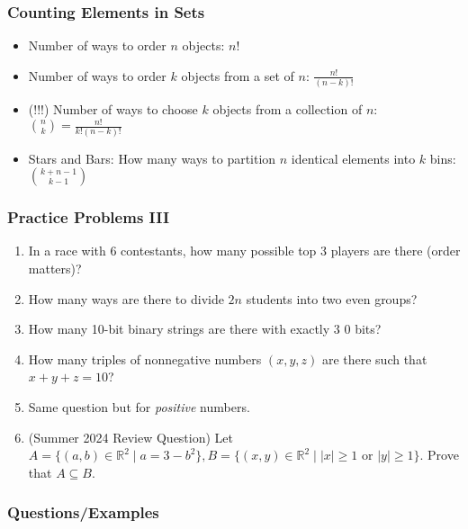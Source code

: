 \documentclass{beamer}
\begin{document}
\begin{frame}
  \frametitle{Counting Elements in Sets}
  \begin{itemize}[<+->]
    \item Number of ways to order $n$ objects: $n!$
    \item Number of ways to order $k$ objects from a set of $n$: $\frac{n!}{(n-k)!}$
    \item (!!!) Number of ways to choose $k$ objects from a collection of $n$: ${n \choose k} = \frac{n!}{k!(n - k)!}$
    \item Stars and Bars: How many ways to partition $n$ identical elements into $k$ bins: ${k + n - 1 \choose k - 1}$
  \end{itemize}
\end{frame}

\begin{frame}[t]
  \frametitle{Practice Problems III}
  \begin{enumerate}[<+->]
    \item In a race with $6$ contestants, how many possible top 3 players are there (order matters)?
    \item How many ways are there to divide $2n$ students into two even groups?
    \item How many 10-bit binary strings are there with exactly 3 0 bits?
    \item How many triples of nonnegative numbers $(x, y, z)$ are there such that $x + y + z = 10$?
    \item Same question but for \textit{positive} numbers.
    \item (Summer 2024 Review Question) Let $A = \{(a, b) \in \mathbb{R}^2 \mid a = 3 - b^2\}, B = \{(x, y) \in \mathbb{R}^2 \mid |x| \geq 1 \text{ or } |y| \geq 1\}$. Prove that $A \subseteq B$.
  \end{enumerate}
\end{frame}

\begin{frame}
  \frametitle{Questions/Examples}
\end{frame}
\end{document}
